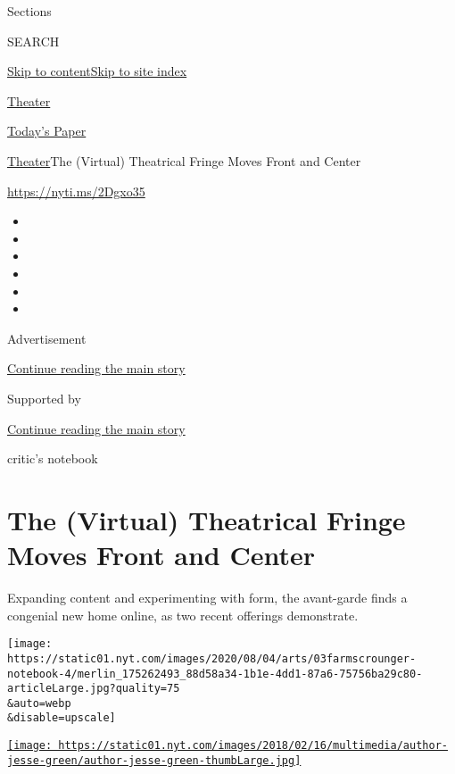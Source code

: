 Sections

SEARCH

\protect\hyperlink{site-content}{Skip to
content}\protect\hyperlink{site-index}{Skip to site index}

\href{https://www.nytimes.com/section/theater}{Theater}

\href{https://myaccount.nytimes.com/auth/login?response_type=cookie\&client_id=vi}{}

\href{https://www.nytimes.com/section/todayspaper}{Today's Paper}

\href{/section/theater}{Theater}\textbar{}The (Virtual) Theatrical
Fringe Moves Front and Center

\url{https://nyti.ms/2Dgxo35}

\begin{itemize}
\item
\item
\item
\item
\item
\item
\end{itemize}

Advertisement

\protect\hyperlink{after-top}{Continue reading the main story}

Supported by

\protect\hyperlink{after-sponsor}{Continue reading the main story}

critic's notebook

\hypertarget{the-virtual-theatrical-fringe-moves-front-and-center}{%
\section{The (Virtual) Theatrical Fringe Moves Front and
Center}\label{the-virtual-theatrical-fringe-moves-front-and-center}}

Expanding content and experimenting with form, the avant-garde finds a
congenial new home online, as two recent offerings demonstrate.

\texttt{[image: https://static01.nyt.com/images/2020/08/04/arts/03farmscrounger-notebook-4/merlin\_175262493\_88d58a34-1b1e-4dd1-87a6-75756ba29c80-articleLarge.jpg?quality=75\\\&auto=webp\\\&disable=upscale]}

\href{https://www.nytimes.com/by/jesse-green}{\texttt{[image: https://static01.nyt.com/images/2018/02/16/multimedia/author-jesse-green/author-jesse-green-thumbLarge.jpg]}}

